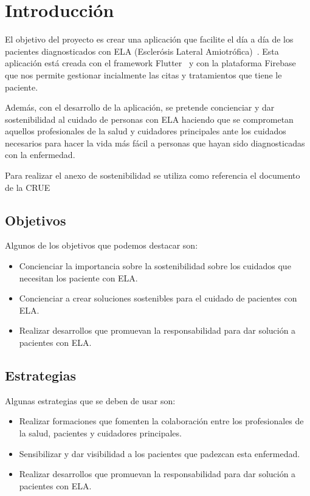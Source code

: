 
\section{Introducción}
El objetivo del proyecto es crear una aplicación que facilite el día a día de los pacientes diagnosticados con ELA (Esclerósis Lateral Amiotrófica)~\cite{wiki:ela}. Esta aplicación está creada con el framework Flutter~\cite{flutter} y con la plataforma Firebase~\cite{firebase} que nos permite gestionar incialmente las citas y tratamientos que tiene le paciente. 

Además, con el desarrollo de la aplicación, se pretende concienciar y dar sostenibilidad al cuidado de personas con ELA haciendo que se comprometan aquellos profesionales de la salud y cuidadores principales ante los cuidados necesarios para hacer la vida más fácil a personas que hayan sido diagnosticadas con la enfermedad.

Para realizar el anexo de sostenibilidad se utiliza como referencia el documento de la CRUE~\cite{crue}

\subsection{Objetivos}
Algunos de los objetivos que podemos destacar son:
\begin{itemize}
\tightlist 
\item Concienciar la importancia sobre la sostenibilidad sobre los cuidados que necesitan los paciente con ELA.
\item Concienciar a crear soluciones sostenibles para el cuidado de pacientes con ELA.
\item Realizar desarrollos que promuevan la responsabilidad para dar solución a pacientes con ELA.
\end{itemize}

\subsection{Estrategias}
Algunas estrategias que se deben de usar son:
\begin{itemize}
\tightlist 
\item Realizar formaciones que fomenten la colaboración entre los profesionales de la salud, pacientes y cuidadores principales.
\item Sensibilizar y dar visibilidad a los pacientes que padezcan esta enfermedad.
\item Realizar desarrollos que promuevan la responsabilidad para dar solución a pacientes con ELA.
\end{itemize}

